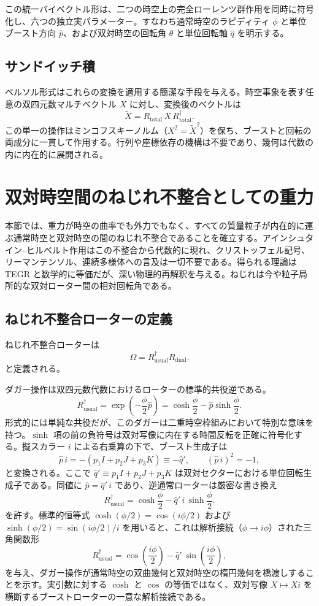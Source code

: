 \documentclass[dvipdfmx,a4paper]{article}
\begin{document}
この統一バイベクトル形は、二つの時空上の完全ローレンツ群作用を同時に符号化し、六つの独立実パラメーター。すなわち通常時空のラピディティ $\phi$ と単位ブースト方向 $\hat{p}$、および双対時空の回転角 $\theta$ と単位回転軸 $\hat{q}$ を明示する。

\subsection{サンドイッチ積}

ベルソル形式はこれらの変換を適用する簡潔な手段を与える。時空事象を表す任意の双四元数マルチベクトル $X$ に対し、変換後のベクトルは
\[
\tilde{X} = R_\text{total} \, X \, R_\text{total}^\dagger.
\]
この単一の操作はミンコフスキーノルム（$X^2 = \tilde{X}^2$）を保ち、ブーストと回転の両成分に一貫して作用する。行列や座標依存の機構は不要であり、幾何は代数の内に内在的に展開される。

\section{双対時空間のねじれ不整合としての重力}
\label{sec:gravity}

本節では、重力が時空の曲率でも外力でもなく、すべての質量粒子が内在的に運ぶ通常時空と双対時空の間のねじれ不整合であることを確立する。アインシュタイン--ヒルベルト作用はこの不整合から代数的に現れ、クリストッフェル記号、リーマンテンソル、連続多様体への言及は一切不要である。得られる理論は TEGR と数学的に等価だが、深い物理的再解釈を与える。ねじれは今や粒子局所的な双対ローター間の相対回転角である。

\subsection{ねじれ不整合ローターの定義}

ねじれ不整合ローターは
\[
\Omega = R_\text{usual}^\dagger R_\text{dual}.
\]
と定義される。

ダガー操作は双四元数代数におけるローターの標準的共役逆である。
\[
R_\text{usual}^\dagger = \exp\!\left( -\frac{\phi}{2} \hat{p} \right)
= \cosh\frac{\phi}{2} - \hat{p} \sinh\frac{\phi}{2}.
\]
形式的には単純な共役だが、このダガーは二重時空枠組みにおいて特別な意味を持つ。$\sinh$ 項の前の負符号は双対写像に内在する時間反転を正確に符号化する。擬スカラー $i$ による右乗算の下で、ブースト生成子は
\[
\hat{p}\, i = - (p_1 I + p_2 J + p_3 K) \equiv -\hat{q}',
\qquad (\hat{p}\, i)^2 = -1,
\]
と変換される。ここで $\hat{q}' \equiv p_1 I + p_2 J + p_3 K$ は双対セクターにおける単位回転生成子である。同値に $\hat{p} = \hat{q}'\, i$ であり、逆通常ローターは厳密な書き換え
\[
R_\text{usual}^\dagger = \cosh\frac{\phi}{2} - \hat{q}'\, i\, \sinh\frac{\phi}{2}.
\]
を許す。標準的恒等式 $\cosh(\phi/2) = \cos(i\phi/2)$ および $\sinh(\phi/2) = \sin(i\phi/2)/i$ を用いると、これは解析接続（$\phi \to i\phi$）された三角関数形
\[
R_\text{usual}^\dagger = \cos\!\left(\frac{i\phi}{2}\right) - \hat{q}'\, \sin\!\left(\frac{i\phi}{2}\right),
\]
を与え、ダガー操作が通常時空の双曲幾何と双対時空の楕円幾何を橋渡しすることを示す。実引数に対する $\cosh$ と $\cos$ の等価ではなく、双対写像 $X \mapsto X i$ を横断するブーストローターの一意な解析接続である。
\end{document}
